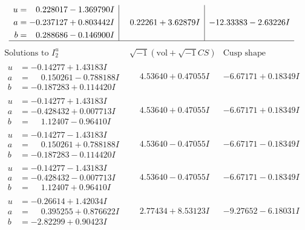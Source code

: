 \documentclass[1p]{elsarticle_modified}
\theoremstyle{definition}
\newcommand{\I}{\sqrt{-1}}
\begin{document}
$$\begin{array}{c|c|c}
\begin{aligned}
u &= \phantom{-}0.228017 - 1.369790 I \\
a &= -0.237127 + 0.803442 I \\
b &= \phantom{-}0.288686 - 0.146900 I\end{aligned}
 & \phantom{-}0.22261 + 3.62879 I & -12.33383 - 2.63226 I\\
 \hline 
 \end{array}$$\newpage$$\begin{array}{c|c|c}  
\text{Solutions to }I^u_{2}& \I (\text{vol} + \sqrt{-1}CS) & \text{Cusp shape}\\
 \hline 
\begin{aligned}
u &= -0.14277 + 1.43183 I \\
a &= \phantom{-}0.150261 - 0.788188 I \\
b &= -0.187283 + 0.114420 I\end{aligned}
 & \phantom{-}4.53640 + 0.47055 I & -6.67171 + 0.18349 I \\ \hline\begin{aligned}
u &= -0.14277 + 1.43183 I \\
a &= -0.428432 + 0.007713 I \\
b &= \phantom{-}1.12407 - 0.96410 I\end{aligned}
 & \phantom{-}4.53640 + 0.47055 I & -6.67171 + 0.18349 I \\ \hline\begin{aligned}
u &= -0.14277 - 1.43183 I \\
a &= \phantom{-}0.150261 + 0.788188 I \\
b &= -0.187283 - 0.114420 I\end{aligned}
 & \phantom{-}4.53640 - 0.47055 I & -6.67171 - 0.18349 I \\ \hline\begin{aligned}
u &= -0.14277 - 1.43183 I \\
a &= -0.428432 - 0.007713 I \\
b &= \phantom{-}1.12407 + 0.96410 I\end{aligned}
 & \phantom{-}4.53640 - 0.47055 I & -6.67171 - 0.18349 I \\ \hline\begin{aligned}
u &= -0.26614 + 1.42034 I \\
a &= \phantom{-}0.395255 + 0.876622 I \\
b &= -2.82299 + 0.90423 I\end{aligned}
 & \phantom{-}2.77434 + 8.53123 I & -9.27652 - 6.18031 I \\ \hline\begin{aligned}

\end{aligned}
\end{array}$$
\end{document}
